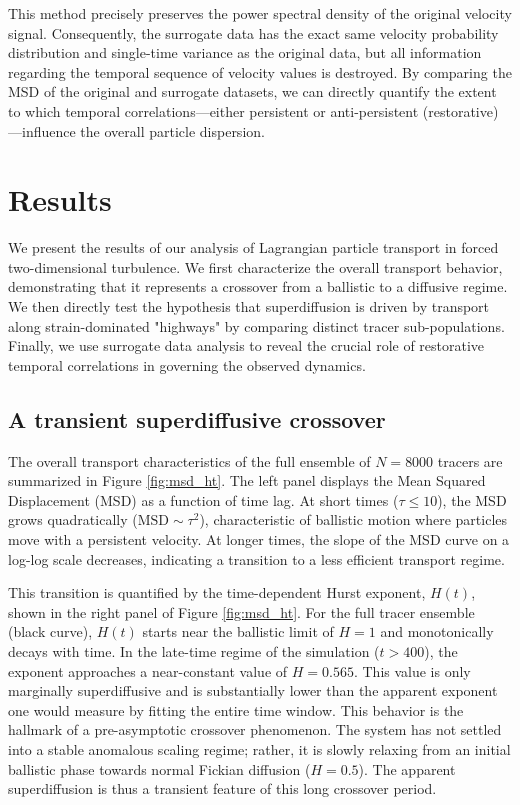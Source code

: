 \documentclass[]{article}
\begin{document}
This method precisely preserves the power spectral density of the original velocity signal. Consequently, the surrogate data has the exact same velocity probability distribution and single-time variance as the original data, but all information regarding the temporal sequence of velocity values is destroyed. By comparing the MSD of the original and surrogate datasets, we can directly quantify the extent to which temporal correlations—either persistent or anti-persistent (restorative)—influence the overall particle dispersion.

\section{Results}
\label{sec:results}
We present the results of our analysis of Lagrangian particle transport in forced two-dimensional turbulence. We first characterize the overall transport behavior, demonstrating that it represents a crossover from a ballistic to a diffusive regime. We then directly test the hypothesis that superdiffusion is driven by transport along strain-dominated "highways" by comparing distinct tracer sub-populations. Finally, we use surrogate data analysis to reveal the crucial role of restorative temporal correlations in governing the observed dynamics.

\subsection{A transient superdiffusive crossover}

The overall transport characteristics of the full ensemble of $N=8000$ tracers are summarized in Figure \ref{fig:msd_ht}. The left panel displays the Mean Squared Displacement (MSD) as a function of time lag. At short times ($\tau \leq 10$), the MSD grows quadratically ($\mathrm{MSD} \sim \tau^2$), characteristic of ballistic motion where particles move with a persistent velocity. At longer times, the slope of the MSD curve on a log-log scale decreases, indicating a transition to a less efficient transport regime.

This transition is quantified by the time-dependent Hurst exponent, $H(t)$, shown in the right panel of Figure \ref{fig:msd_ht}. For the full tracer ensemble (black curve), $H(t)$ starts near the ballistic limit of $H=1$ and monotonically decays with time. In the late-time regime of the simulation ($t > 400$), the exponent approaches a near-constant value of $H = 0.565$. This value is only marginally superdiffusive and is substantially lower than the apparent exponent one would measure by fitting the entire time window. This behavior is the hallmark of a pre-asymptotic crossover phenomenon. The system has not settled into a stable anomalous scaling regime; rather, it is slowly relaxing from an initial ballistic phase towards normal Fickian diffusion ($H=0.5$). The apparent superdiffusion is thus a transient feature of this long crossover period.
\end{document}
